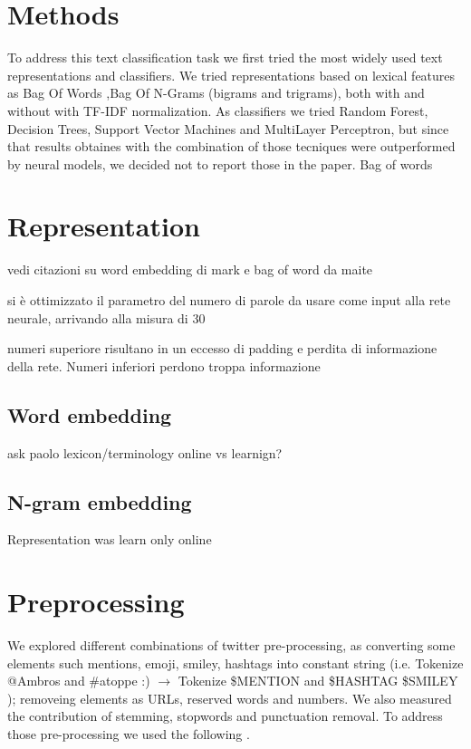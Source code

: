 \section{Methods} \label{sec:methods}
To address this text classification task we first tried the most widely used text representations and classifiers.
We tried representations based on lexical features as Bag Of Words \cite{harris1954distributional},Bag Of N-Grams (bigrams and trigrams), both with and without with TF-IDF normalization.
As classifiers we tried Random Forest, Decision Trees, Support Vector Machines and MultiLayer Perceptron, but since that results obtaines with the combination of those tecniques were outperformed by neural models, we decided not to report those in the paper.
Bag of words
\section{Representation}

vedi citazioni su word embedding di mark e bag of word da maite



si è ottimizzato il parametro del numero di parole da usare come input alla rete neurale, arrivando alla misura di 30

numeri superiore risultano in un eccesso di padding e perdita di informazione della rete. Numeri inferiori perdono troppa informazione

\subsection{Word embedding}

ask paolo lexicon/terminology online vs learnign?


\subsection{N-gram embedding}

Representation was learn only online 


\section{Preprocessing}
We explored different combinations of twitter pre-processing, as converting some elements such mentions, emoji, smiley, hashtags into constant string (i.e. Tokenize @Ambros and \#atoppe :) $\rightarrow $ Tokenize \$MENTION and \$HASHTAG \$SMILEY ); removeing elements as URLs, reserved words and numbers.
We also measured the contribution of stemming, stopwords and punctuation removal.
To address those pre-processing we used the following \cite{nltk} \cite{tweets-preprocessor}.


